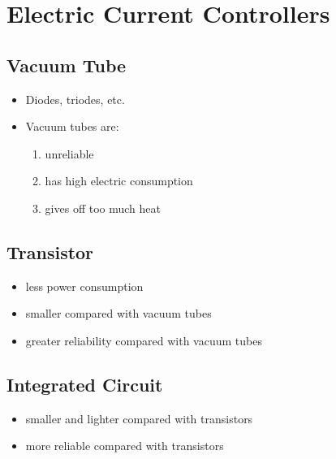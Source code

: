 \documentclass[9pt,twocolumn]{article}
\begin{document}
\section*{Electric Current Controllers}
  \subsection*{Vacuum Tube}
  \begin{itemize}
    \item Diodes, triodes, etc.
    \item Vacuum tubes are:
      \begin{enumerate}
        \item unreliable
        \item has high electric consumption
        \item gives off too much heat
      \end{enumerate}
  \end{itemize}
  
  \subsection*{Transistor}
  \begin{itemize}
    \item less power consumption
    \item smaller compared with vacuum tubes
    \item greater reliability compared with vacuum tubes
  \end{itemize}
  
  \subsection*{Integrated Circuit}
  \begin{itemize}
    \item smaller and lighter compared with transistors
    \item more reliable compared with transistors
  \end{itemize}
  
\end{document}
